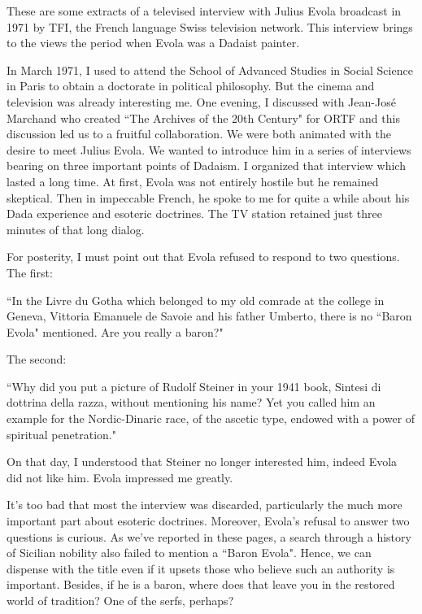 \begin{quotationx}
These are some extracts of a televised interview with Julius Evola broadcast in 1971 by TFI, the French language Swiss television network. This interview brings to the views the period when Evola was a Dadaist painter.

In March 1971, I used to attend the School of Advanced Studies in Social Science in Paris to obtain a doctorate in political philosophy. But the cinema and television was already interesting me. One evening, I discussed with Jean-José Marchand who created ``The Archives of the 20th Century" for ORTF and this discussion led us to a fruitful collaboration. We were both animated with the desire to meet Julius Evola. We wanted to introduce him in a series of interviews bearing on three important points of Dadaism. I organized that interview which lasted a long time. At first, Evola was not entirely hostile but he remained skeptical. Then in impeccable French, he spoke to me for quite a while about his Dada experience and esoteric doctrines. The TV station retained just three minutes of that long dialog.

For posterity, I must point out that Evola refused to respond to two questions. The first:

``In the Livre du Gotha which belonged to my old comrade at the college in Geneva, Vittoria Emanuele de Savoie and his father Umberto, there is no ``Baron Evola" mentioned. Are you really a baron?"

The second:

``Why did you put a picture of Rudolf Steiner in your 1941 book, Sintesi di dottrina della razza, without mentioning his name? Yet you called him an example for the Nordic-Dinaric race, of the ascetic type, endowed with a power of spiritual penetration."

On that day, I understood that Steiner no longer interested him, indeed Evola did not like him. Evola impressed me greatly. 

\end{quotationx}
It's too bad that most the interview was discarded, particularly the much more important part about esoteric doctrines. Moreover, Evola's refusal to answer two questions is curious. As we've reported in these pages, a search through a history of Sicilian nobility also failed to mention a ``Baron Evola". Hence, we can dispense with the title even if it upsets those who believe such an authority is important. Besides, if he is a baron, where does that leave you in the restored world of tradition? One of the serfs, perhaps?

